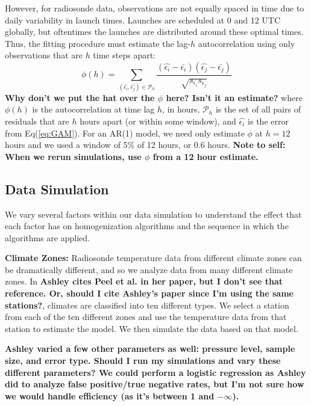\documentclass[12pt]{article}
\def\ni{\noindent}
\begin{document}
\begin{doublespacing}
However, for radiosonde data, observations are not equally spaced in time due to daily variability in launch times.  Launches are scheduled at 0 and 12 UTC globally, but oftentimes the launches are distributed around these optimal times.  Thus, the fitting procedure must estimate the lag-$h$ autocorrelation using only observations that are $h$ time steps apart:
\begin{equation} \label{eq:ACF}
	\phi(h)=\sum_{(\widehat{\epsilon_i},\widehat{\epsilon_j}) \in \mathcal{P}_h} \frac{(\widehat{\epsilon_i}-\bar{\epsilon_i})(\widehat{\epsilon_j}-\bar{\epsilon_j})}{\sqrt{s_{\epsilon_i} s_{\epsilon_j}}}
\end{equation}
\textbf{Why don't we put the hat over the $\phi$ here?  Isn't it an estimate?}
\ni where $\phi(h)$ is the autocorrelation at time lag $h$, in hours, $\mathcal{P}_h$ is the set of all pairs of residuals that are $h$ hours apart (or within some window), and $\widehat{\epsilon_i}$ is the error from Eq(\ref{eq:GAM}).  For an AR(1) model, we need only estimate $\phi$ at $h=12$ hours and we used a window of 5\% of 12 hours, or 0.6 hours.  \textbf{Note to self: When we rerun simulations, use $\phi$ from a 12 hour estimate.}

\subsection{Data Simulation}
\label{ssec:sim}

We vary several factors within our data simulation to understand the effect that each factor has on homogenization algorithms and the sequence in which the algorithms are applied.

\textbf{Climate Zones:} Radiosonde temperature data from different climate zones can be dramatically different, and so we analyze data from many different climate zones.  In \cite{peel??}\textbf{Ashley cites Peel et al. in her paper, but I don't see that reference.  Or, should I cite Ashley's paper since I'm using the same stations?}, climates are classified into ten different types.  We select a station from each of the ten different zones and use the temperature data from that station to estimate the model.  We then simulate the data based on that model.

\textbf{Ashley varied a few other parameters as well: pressure level, sample size, and error type.  Should I run my simulations and vary these different parameters?  We could perform a logistic regression as Ashley did to analyze false positive/true negative rates, but I'm not sure how we would handle efficiency (as it's between 1 and $-\infty$).}


\end{doublespacing}
\end{document}
